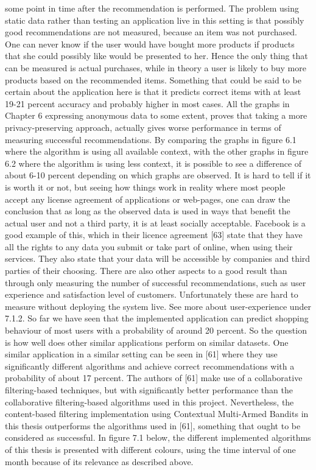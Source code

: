 some point in time after the recommendation is performed. The problem using static
data rather than testing an application live in this setting is that possibly good recommendations are not measured, because an item was not purchased. One can never know
if the user would have bought more products if products that she could possibly like
would be presented to her. Hence the only thing that can be measured is actual purchases, while in theory a user is likely to buy more products based on the recommended
items. Something that could be said to be certain about the application here is that it
predicts correct items with at least 19-21 percent accuracy and probably higher in most
cases.
All the graphs in Chapter 6 expressing anonymous data to some extent, proves that
taking a more privacy-preserving approach, actually gives worse performance in terms
of measuring successful recommendations. By comparing the graphs in figure 6.1 where
the algorithm is using all available context, with the other graphs in figure 6.2 where
the algorithm is using less context, it is possible to see a difference of about 6-10 percent
depending on which graphs are observed. It is hard to tell if it is worth it or not, but
seeing how things work in reality where most people accept any license agreement of applications or web-pages, one can draw the conclusion that as long as the observed data
is used in ways that benefit the actual user and not a third party, it is at least socially
acceptable. Facebook is a good example of this, which in their licence agreement [63]
state that they have all the rights to any data you submit or take part of online, when
using their services. They also state that your data will be accessible by companies and
third parties of their choosing.
There are also other aspects to a good result than through only measuring the number of
successful recommendations, such as user experience and satisfaction level of customers.
Unfortunately these are hard to measure without deploying the system live. See more
about user-experience under 7.1.2.
So far we have seen that the implemented application can predict shopping behaviour
of most users with a probability of around 20 percent. So the question is how well
does other similar applications perform on similar datasets. One similar application in
a similar setting can be seen in [61] where they use significantly different algorithms and
achieve correct recommendations with a probability of about 17 percent. The authors
of [61] make use of a collaborative filtering-based techniques, but with significantly better performance than the collaborative filtering-based algorithms used in this project.
Nevertheless, the content-based filtering implementation using Contextual Multi-Armed
Bandits in this thesis outperforms the algorithms used in [61], something that ought to
be considered as successful. In figure 7.1 below, the different implemented algorithms
of this thesis is presented with different colours, using the time interval of one month
because of its relevance as described above.

